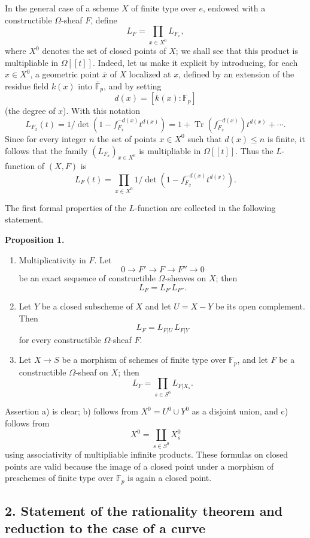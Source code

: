 \documentclass[11pt]{article}
\newenvironment{statement}[1]{\par\medskip\noindent\textbf{#1.}\ }{\par\medskip}
\providecommand{\Tr}{\operatorname{Tr}}
\providecommand{\Tr}{\operatorname{Tr}}
\providecommand{\Tr}{\operatorname{Tr}}
\providecommand{\Tr}{\operatorname{Tr}}
\providecommand{\Tr}{\operatorname{Tr}}
\begin{document}
In the general case of a scheme $X$ of finite type over $e$, endowed with a constructible $\Omega$-sheaf $F$, define
\[
L_F=\prod_{x\in X^0}L_{F_x},
\]
where $X^0$ denotes the set of closed points of $X$; we shall see that this product is multipliable in $\Omega[[t]]$. Indeed, let us make it explicit by introducing, for each $x\in X^0$, a geometric point $\bar x$ of $X$ localized at $x$, defined by an extension of the residue field $k(x)$ into $\bar{\mathbb F}_p$, and by setting
\[
d(x)=[k(x):\mathbb F_p]
\]
(the degree of $x$). With this notation
\[
L_{F_x}(t)=1/\det(1-f_{F_{\bar x}}^{-d(x)}t^{d(x)})
 =1+\Tr(f_{F_{\bar x}}^{-d(x)})t^{d(x)}+\cdots .
\]
Since for every integer $n$ the set of points $x\in X^0$ such that $d(x)\le n$ is finite, it follows that the family $(L_{F_x})_{x\in X^0}$ is multipliable in $\Omega[[t]]$. Thus the $L$-function of $(X,F)$ is
\[
L_F(t)=\prod_{x\in X^0}1/\det(1-f_{F_{\bar x}}^{-d(x)}t^{d(x)}).
\]

The first formal properties of the $L$-function are collected in the following statement.

\begin{statement}{Proposition 1}
\begin{enumerate}[label=\alph*)]
\item Multiplicativity in $F$. Let
\[
0\longrightarrow F'\longrightarrow F\longrightarrow F''\longrightarrow0
\]
be an exact sequence of constructible $\Omega$-sheaves on $X$; then
\[
L_F=L_{F'}L_{F''}.
\]
\item Let $Y$ be a closed subscheme of $X$ and let $U=X-Y$ be its open complement. Then
\[
L_F=L_{F|U}\,L_{F|Y}
\]
for every constructible $\Omega$-sheaf $F$.
\item Let $X\to S$ be a morphism of schemes of finite type over $\mathbb F_p$, and let $F$ be a constructible $\Omega$-sheaf on $X$; then
\[
L_F=\prod_{s\in S^0}L_{F|X_s}.
\]
\end{enumerate}
\end{statement}

Assertion a) is clear; b) follows from $X^0=U^0\cup Y^0$ as a disjoint union, and c) follows from
\[
X^0=\coprod_{s\in S^0}X_s^0
\]
using associativity of multipliable infinite products. These formulas on closed points are valid because the image of a closed point under a morphism of preschemes of finite type over $\mathbb F_p$ is again a closed point.

\subsection*{2. Statement of the rationality theorem and reduction to the case of a curve}
\end{document}
